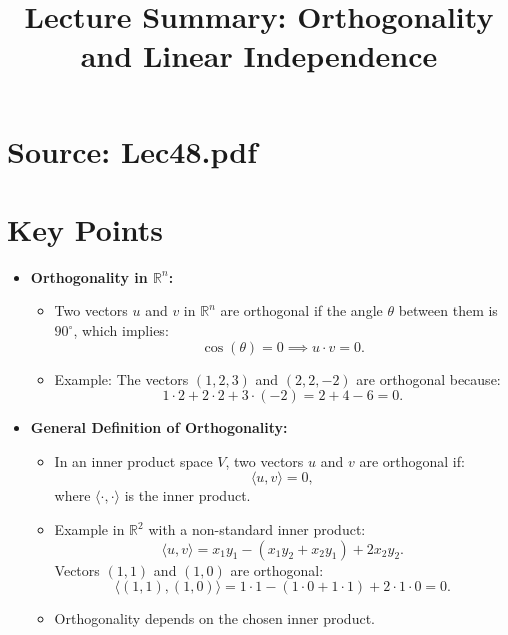 \documentclass{article}
\title{Lecture Summary: Orthogonality and Linear Independence}
\author{}
\date{}
\begin{document}
\maketitle

\section*{Source: Lec48.pdf}

\section*{Key Points}

\begin{itemize}
  \item \textbf{Orthogonality in $\mathbb{R}^n$:}
    \begin{itemize}
      \item Two vectors $u$ and $v$ in $\mathbb{R}^n$ are orthogonal if the angle $\theta$ between them is $90^\circ$, which implies:
        \[
          \cos(\theta) = 0 \implies u \cdot v = 0.
        \]
      \item Example: The vectors $(1, 2, 3)$ and $(2, 2, -2)$ are orthogonal because:
        \[
          1 \cdot 2 + 2 \cdot 2 + 3 \cdot (-2) = 2 + 4 - 6 = 0.
        \]
    \end{itemize}

  \item \textbf{General Definition of Orthogonality:}
    \begin{itemize}
      \item In an inner product space $V$, two vectors $u$ and $v$ are orthogonal if:
        \[
          \langle u, v \rangle = 0,
        \]
        where $\langle \cdot, \cdot \rangle$ is the inner product.
      \item Example in $\mathbb{R}^2$ with a non-standard inner product:
        \[
          \langle u, v \rangle = x_1 y_1 - (x_1 y_2 + x_2 y_1) + 2x_2 y_2.
        \]
        Vectors $(1, 1)$ and $(1, 0)$ are orthogonal:
        \[
          \langle (1, 1), (1, 0) \rangle = 1 \cdot 1 - (1 \cdot 0 + 1 \cdot 1) + 2 \cdot 1 \cdot 0 = 0.
        \]
      \item Orthogonality depends on the chosen inner product.
    \end{itemize}


\end{itemize}
\end{document}
